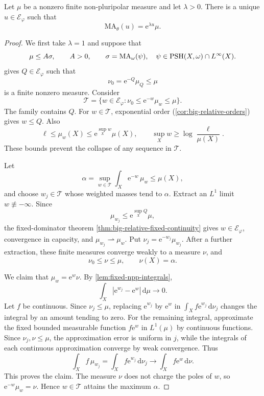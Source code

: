 \begin{theorem}\label{thm:big-model-exponential}
Let $\mu$ be a nonzero finite non-pluripolar measure and let $\lambda>0$. There is a unique $u\in\mathcal E_\varphi$ such that
\[
 \mathrm{MA}_\theta(u)=\mathrm{e}^{\lambda u}\mu.
\]
\end{theorem}
\begin{proof}
We first take $\lambda=1$ and suppose that
\[
 \mu\leq A\sigma,\qquad A>0,\qquad
 \sigma=\mathrm{MA}_\omega(\psi),\quad
 \psi\in\mathrm{PSH}(X,\omega)\cap L^\infty(X).
\]
 gives $Q\in\mathcal E_\varphi$ such that
\[
 \nu_0=\mathrm{e}^{-Q}\mu_Q\leq\mu
\]
is a finite nonzero measure. Consider
\[
 \mathcal T=\{w\in\mathcal E_\varphi:
              \nu_0\leq \mathrm{e}^{-w}\mu_w\leq\mu\}.
\]
The family contains $Q$. For $w\in\mathcal T$, exponential order (\cref{cor:big-relative-orders}) gives $w\leq Q$. Also
\[
 \ell\leq\mu_w(X)\leq \mathrm{e}^{\sup_Xw}\mu(X),
 \qquad
 \sup_Xw\geq\log\frac{\ell}{\mu(X)}.
\]
These bounds prevent the collapse of any sequence in $\mathcal T$.

Let
\[
 \alpha=\sup_{w\in\mathcal T}\int_X\mathrm{e}^{-w}\,\mu_w\leq\mu(X),
\]
and choose $w_j\in\mathcal T$ whose weighted masses tend to $\alpha$. Extract an $L^1$ limit $w\not\equiv-\infty$. Since
\[
 \mu_{w_j}\leq \mathrm{e}^{\sup_XQ}\mu,
\]
the fixed-dominator theorem \cref{thm:big-relative-fixed-continuity} gives $w\in\mathcal E_\varphi$, convergence in capacity, and $\mu_{w_j}\rightharpoonup\mu_w$. Put $\nu_j=\mathrm{e}^{-w_j}\mu_{w_j}$. After a further extraction, these finite measures converge weakly to a measure $\nu$, and
\[
 \nu_0\leq\nu\leq\mu,\qquad \nu(X)=\alpha.
\]

We claim that $\mu_w=\mathrm{e}^w\nu$. By \cref{lem:fixed-npp-integrals},
\[
 \int_X|\mathrm{e}^{w_j}-\mathrm{e}^w|\,\mathrm{d}\mu\longrightarrow0.
\]
Let $f$ be continuous. Since $\nu_j\leq\mu$, replacing $\mathrm{e}^{w_j}$ by $\mathrm{e}^w$ in $\int_Xf \mathrm{e}^{w_j}\,\mathrm{d}\nu_j$ changes the integral by an amount tending to zero. For the remaining integral, approximate the fixed bounded measurable function $f \mathrm{e}^w$ in $L^1(\mu)$ by continuous functions. Since $\nu_j,\nu\leq\mu$, the approximation error is uniform in $j$, while the integrals of each continuous approximation converge by weak convergence. Thus
\[
 \int_Xf\,\mu_{w_j}
 =\int_Xf \mathrm{e}^{w_j}\,\mathrm{d}\nu_j
 \longrightarrow\int_Xf \mathrm{e}^w\,\mathrm{d}\nu.
\]
This proves the claim. The measure $\nu$ does not charge the poles of $w$, so $\mathrm{e}^{-w}\mu_w=\nu$. Hence $w\in\mathcal T$ attains the maximum $\alpha$.


\end{proof}
